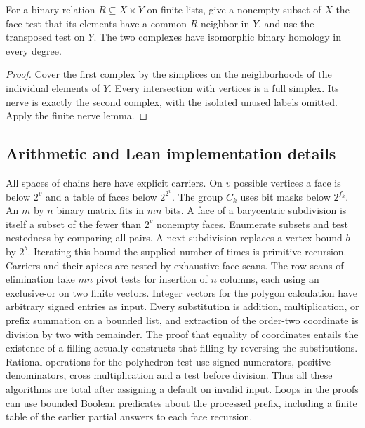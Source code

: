 \begin{corollary}\label{idx-algebraic589}
For a binary relation $R\subseteq X\times Y$ on finite lists, give a
nonempty subset of $X$ the face test that its elements have a common
$R$-neighbor in $Y$, and use the transposed test on $Y$.
The two complexes have isomorphic binary homology in every degree.
\end{corollary}
\begin{proof}
Cover the first complex by the simplices on the neighborhoods of the
individual elements of $Y$. Every intersection with vertices is a full
simplex. Its nerve is exactly the second complex, with the isolated
unused labels omitted. Apply the finite nerve lemma.
\end{proof}

\subsection{Arithmetic and Lean implementation details}
All spaces of chains here have explicit carriers. On $v$ possible
vertices a face is below $2^v$ and a table of faces below $2^{2^v}$.
The group $C_k$ uses bit masks below $2^{f_k}$. An $m$ by $n$ binary
matrix fits in $mn$ bits. A face of a barycentric subdivision is itself
a subset of the fewer than $2^v$ nonempty faces. Enumerate subsets and
test nestedness by comparing all pairs. A next subdivision replaces a
vertex bound $b$ by $2^b$. Iterating this bound the supplied number of
times is primitive recursion. Carriers and their apices are tested by
exhaustive face scans. The row scans of elimination take $mn$ pivot
tests for insertion of $n$ columns, each using an exclusive-or on two
finite vectors. Integer vectors for the polygon calculation have arbitrary
signed entries as input. Every substitution is addition, multiplication,
or prefix summation on a bounded list, and extraction of the order-two
coordinate is division by two with remainder. The proof that equality of
coordinates entails the existence of a filling actually constructs that
filling by reversing the substitutions. Rational operations for the
polyhedron test use signed numerators, positive denominators, cross
multiplication and a test before division. Thus all these algorithms
are total after assigning a default on invalid input. Loops in the
proofs can use bounded Boolean predicates about the processed prefix,
including a finite table of the earlier partial answers to each face
recursion.

